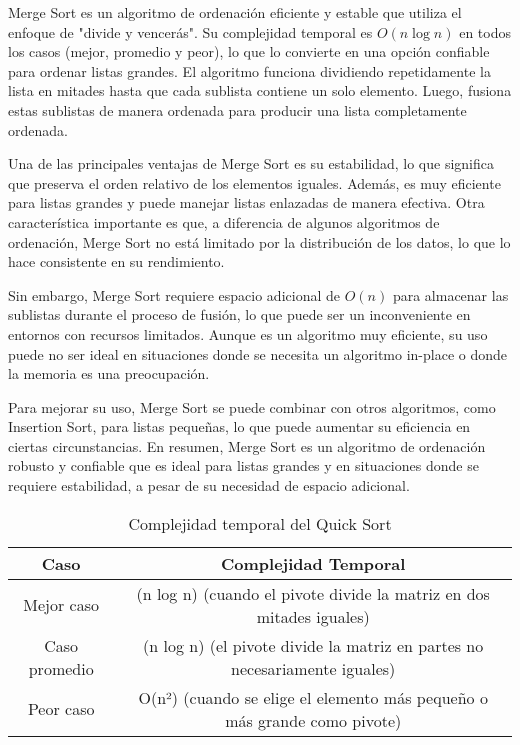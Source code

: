 Merge Sort es un algoritmo de ordenación eficiente y estable que utiliza el enfoque de "divide y vencerás". Su complejidad temporal es \(O(n \log n)\) en todos los casos (mejor, promedio y peor), lo que lo convierte en una opción confiable para ordenar listas grandes. El algoritmo funciona dividiendo repetidamente la lista en mitades hasta que cada sublista contiene un solo elemento. Luego, fusiona estas sublistas de manera ordenada para producir una lista completamente ordenada.

Una de las principales ventajas de Merge Sort es su estabilidad, lo que significa que preserva el orden relativo de los elementos iguales. Además, es muy eficiente para listas grandes y puede manejar listas enlazadas de manera efectiva. Otra característica importante es que, a diferencia de algunos algoritmos de ordenación, Merge Sort no está limitado por la distribución de los datos, lo que lo hace consistente en su rendimiento.

Sin embargo, Merge Sort requiere espacio adicional de \(O(n)\) para almacenar las sublistas durante el proceso de fusión, lo que puede ser un inconveniente en entornos con recursos limitados. Aunque es un algoritmo muy eficiente, su uso puede no ser ideal en situaciones donde se necesita un algoritmo in-place o donde la memoria es una preocupación.

Para mejorar su uso, Merge Sort se puede combinar con otros algoritmos, como Insertion Sort, para listas pequeñas, lo que puede aumentar su eficiencia en ciertas circunstancias. En resumen, Merge Sort es un algoritmo de ordenación robusto y confiable que es ideal para listas grandes y en situaciones donde se requiere estabilidad, a pesar de su necesidad de espacio adicional.

\begin{table}[h]
    \centering
    \begin{tabular}{|c|c|}
        \hline
        \textbf{Caso} & \textbf{Complejidad Temporal} \\
        \hline
        Mejor caso & (n log n) (cuando el pivote divide la matriz en dos mitades iguales) \\
        \hline
        Caso promedio & (n log n) (el pivote divide la matriz en partes no necesariamente iguales) \\
        \hline
        Peor caso & O(n²) (cuando se elige el elemento más pequeño o más grande como pivote) \\
        \hline
    \end{tabular}
    \caption{Complejidad temporal del Quick Sort}
    \label{tab:complejidad_temporal}
\end{table}

